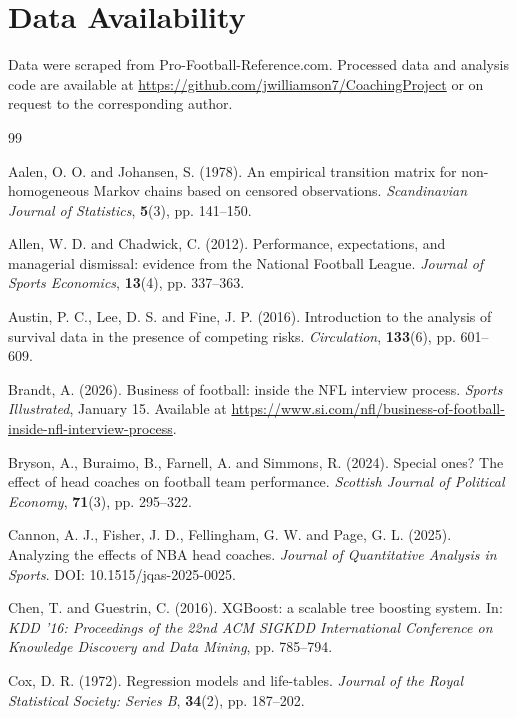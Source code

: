 \documentclass[USenglish]{article}
\theoremstyle{dgthm}
\theoremstyle{dgdef}
\begin{document}
\section*{Data Availability}
Data were scraped from Pro-Football-Reference.com. Processed data and analysis code are available at \url{https://github.com/jwilliamson7/CoachingProject} or on request to the corresponding author.

\begin{thebibliography}{99}

Aalen, O. O. and Johansen, S. (1978). An empirical transition matrix for non-homogeneous Markov chains based on censored observations. \emph{Scandinavian Journal of Statistics}, \textbf{5}(3), pp. 141--150.

Allen, W. D. and Chadwick, C. (2012). Performance, expectations, and managerial dismissal: evidence from the National Football League. \emph{Journal of Sports Economics}, \textbf{13}(4), pp. 337--363.

Austin, P. C., Lee, D. S. and Fine, J. P. (2016). Introduction to the analysis of survival data in the presence of competing risks. \emph{Circulation}, \textbf{133}(6), pp. 601--609.

Brandt, A. (2026). Business of football: inside the NFL interview process. \emph{Sports Illustrated}, January 15. Available at \url{https://www.si.com/nfl/business-of-football-inside-nfl-interview-process}.

Bryson, A., Buraimo, B., Farnell, A. and Simmons, R. (2024). Special ones? The effect of head coaches on football team performance. \emph{Scottish Journal of Political Economy}, \textbf{71}(3), pp. 295--322.

Cannon, A. J., Fisher, J. D., Fellingham, G. W. and Page, G. L. (2025). Analyzing the effects of NBA head coaches. \emph{Journal of Quantitative Analysis in Sports}. DOI: 10.1515/jqas-2025-0025.

Chen, T. and Guestrin, C. (2016). XGBoost: a scalable tree boosting system. In: \emph{KDD '16: Proceedings of the 22nd ACM SIGKDD International Conference on Knowledge Discovery and Data Mining}, pp. 785--794.

Cox, D. R. (1972). Regression models and life-tables. \emph{Journal of the Royal Statistical Society: Series B}, \textbf{34}(2), pp. 187--202.


\end{thebibliography}
\end{document}
